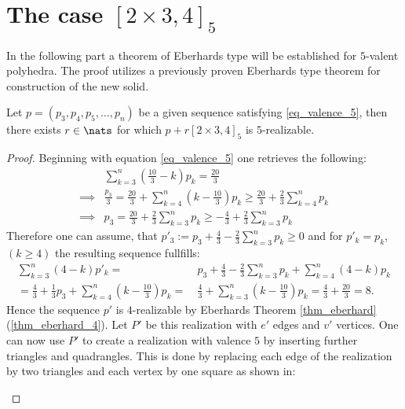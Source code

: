 \section{The case $[2 \times 3, 4]_5$}
In the following part a theorem of Eberhards type will be established for $5$-valent polyhedra. The proof utilizes a previously proven Eberhards type theorem for construction of the new solid.
\begin{theorem}
  Let $p = (p_3, p_4, p_5, \dots, p_n)$ be a given sequence satisfying \ref{eq_valence_5}, then there exists $r \in \nats$ for which $p + r [2 \times 3, 4]_5$ is $5$-realizable.
  \begin{proof}
    Beginning with equation \ref{eq_valence_5} one retrieves the following:
    \begin{align*}
      &\sum_{k=3}^n \left( \frac{10}{3} - k \right) p_k = \frac{20}{3} \\
      \implies & \frac{p_3}{3} = \frac{20}{3} + \sum_{k=4}^n \left(k - \frac{10}{3} \right) p_k \geq \frac{20}{3} + \frac{2}{3} \sum_{k=4}^n p_k \\
      \implies & p_3 = \frac{20}{3} + \frac{2}{3} \sum_{k=3}^n p_k \geq - \frac{4}{3} + \frac{2}{3} \sum_{k=3}^n p_k
    \end{align*}
    Therefore one can assume, that $p'_3 := p_3 + \frac{4}{3} - \frac{2}{3} \sum_{k=3}^n p_k \geq 0$ and for $p'_k = p_k$, $(k\geq 4)$ the resulting sequence fullfills:
   \begin{align*}
     \sum_{k=3}^n (4 - k) p'_k =&~ p_3 + \frac{4}{3} - \frac{2}{3} \sum_{k=3}^n p_k + \sum_{k=4}^n (4 - k) p_k \\
     = \frac{4}{3} + \frac{1}{3} p_3 + \sum_{k=4}^n \left(k - \frac{10}{3} \right) p_k =&~ \frac{4}{3} + \sum_{k=3}^n \left(k - \frac{10}{3} \right) p_k = \frac{4}{3} + \frac{20}{3} = 8.
   \end{align*}
   Hence the sequence $p'$ is $4$-realizable by Eberhards Theorem \ref{thm_eberhard}(\ref{thm_eberhard_4}). Let $P'$ be this realization with $e'$ edges and $v'$ vertices. One can now use $P'$ to create a realization with valence $5$ by inserting further triangles and quadrangles. This is done by replacing each edge of the realization by two triangles and each vertex by one square as shown in:

   \begin{figure}[hptt]\centering
\end{figure}
\end{proof}
\end{theorem}

